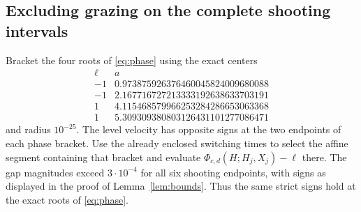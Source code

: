 \documentclass[11pt,a4paper]{article}
\begin{document}
\subsection{Excluding grazing on the complete shooting intervals}
Bracket the four roots of \eqref{eq:phase} using the exact centers
\[
\begin{array}{c|l}
\ell&a\\\hline
-1&0.973875926376460045824009680088\\
-1&2.167716727213333192638633703191\\
 1&4.115468579966253284286653063368\\
 1&5.309309380803126431101277086471
\end{array}
\]
and radius $10^{-25}$. The level velocity has opposite signs at the
two endpoints of each phase bracket. Use the already enclosed switching
times to select the affine segment containing that bracket and evaluate
$\Phi_{c,d}(H;H_j,X_j)-\ell$ there. The gap magnitudes exceed
$3\cdot10^{-4}$ for all six shooting endpoints, with signs as displayed
in the proof of Lemma~\ref{lem:bounds}. Thus the same strict signs hold
at the exact roots of \eqref{eq:phase}.
\end{document}
